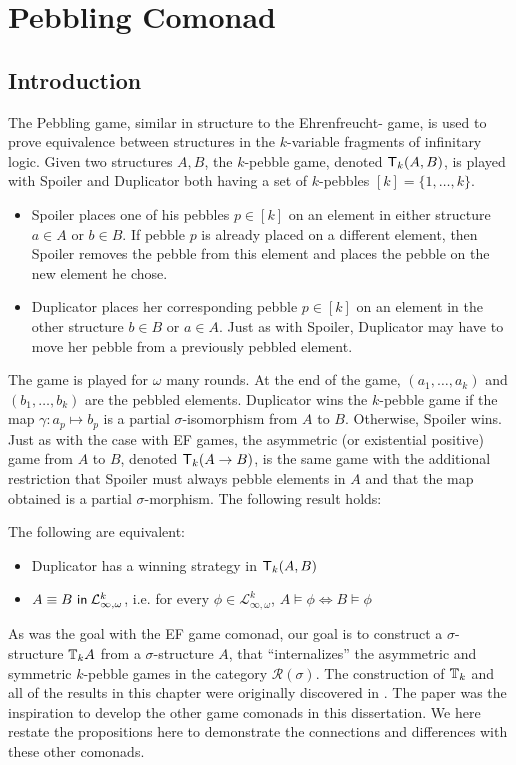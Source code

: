 \chapter{Pebbling Comonad}
\section{Introduction}
The Pebbling game, similar in structure to the Ehrenfreucht-{\Fraisse} game, is used to prove equivalence between structures in the $k$-variable fragments of infinitary logic. Given two structures $A,B$, the $k$-pebble game, denoted ${\mathsf{T}_{k}(A,B)}$, is played with Spoiler and Duplicator both having a set of $k$-pebbles $[k] = \{1,\dots,k\}$.  
\begin{itemize} 
\item Spoiler places one of his pebbles $p \in [k]$ on an element in either structure $a \in A$ or $b \in B$. If pebble $p$ is already placed on a different element, then Spoiler removes the pebble from this element and places the pebble on the new element he chose.  
\item Duplicator places her corresponding pebble $p \in [k]$ on an element in the other structure $b \in B$ or $a \in A$. Just as with Spoiler, Duplicator may have to move her pebble from a previously pebbled element.
\end{itemize} 
The game is played for $\omega$ many rounds. At the end of the game, $(a_{1},\dots,a_{k})$ and $(b_{1},\dots,b_{k})$ are the pebbled elements. Duplicator wins the $k$-pebble game if the map $\gamma:a_{p} \longmapsto b_{p}$ is a partial $\sigma$-isomorphism from $A$ to $B$. Otherwise, Spoiler wins. Just as with the case with EF games, the asymmetric (or existential positive) game from $A$ to $B$, denoted ${\mathsf{T}_{k}(A \rightarrow B)}$, is the same game with the additional restriction that Spoiler must always pebble elements in $A$ and that the map obtained is a partial $\sigma$-morphism. The following result holds:
\begin{prop}
The following are equivalent:
\begin{itemize}
\item Duplicator has a winning strategy in ${\mathsf{T}_{k}(A,B)}$
\item ${A \equiv B \ \mathsf{in}\: \mathcal{L}^{k}_{\infty,\omega}}$, i.e. for every $\phi \in \mathcal{L}^{k}_{\infty,\omega}$, $A \vDash \phi \Leftrightarrow B \vDash \phi$
\end{itemize}
\end{prop}
As was the goal with the EF game comonad, our goal is to construct a $\sigma$-structure ${\mathbb{T}_{k}A}$ from a $\sigma$-structure $A$, that ``internalizes'' the asymmetric and symmetric $k$-pebble games in the category $\mathcal{R}(\sigma)$. The construction of ${\mathbb{T}_{k}}$ and all of the results in this chapter were originally discovered in \cite{Abramsky2017}. The paper \cite{Abramsky2017} was the inspiration to develop the other game comonads in this dissertation. We here restate the propositions here to demonstrate the connections and differences with these other comonads.  
